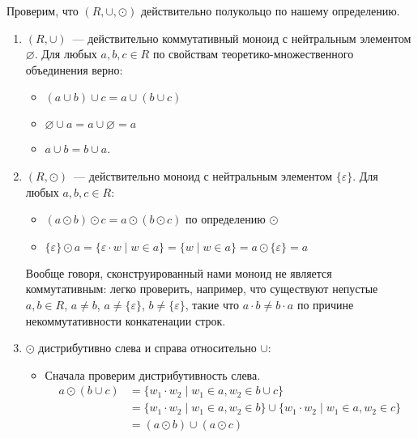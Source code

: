 \begin{example}
    Проверим, что $(R, \cup, \odot)$ действительно полукольцо по нашему определению.
    \begin{enumerate}
        \item $(R, \cup)$~--- действительно коммутативный моноид с нейтральным элементом $\varnothing$.
              Для любых $a, b, c \in R$ по свойствам теоретико-множественного объединения верно:
              \begin{itemize}
                  \item $(a \cup b) \cup c = a \cup (b \cup c)$
                  \item $\varnothing \cup a = a \cup \varnothing = a$
                  \item $a \cup b = b \cup a$.
              \end{itemize}
        \item $(R, \odot)$~--- действительно моноид с нейтральным элементом $\{\varepsilon\}$.
              Для любых $a, b, c \in R$:
              \begin{itemize}
                  \item $(a \odot b) \odot c = a \odot (b \odot c)$ по определению $\odot$
                  \item $\{\varepsilon\} \odot a = \{\varepsilon \cdot w \mid w \in a \} = \{w \mid w \in a \} = a \odot \{\varepsilon\} = a$
              \end{itemize}
              Вообще говоря, сконструированный нами моноид не является коммутативным: легко проверить, например, что существуют непустые $a, b \in R$, $a \neq b$, $a \neq \{\varepsilon\}$, $b \neq \{\varepsilon\}$, такие что $a \cdot b \neq b \cdot a$ по причине некоммутативности конкатенации строк.
        \item $\odot$ дистрибутивно слева и справа относительно $\cup$:
              \begin{itemize}
                  \item Сначала проверим дистрибутивность слева.
                        \begin{align*}
                            a \odot (b \cup c) & = \{ w_1 \cdot w_2 \mid  w_1 \in a, w_2 \in b \cup c\}                                                \\
                                               & = \{ w_1 \cdot w_2 \mid  w_1 \in a, w_2 \in b \} \cup  \{ w_1 \cdot w_2 \mid  w_1 \in a, w_2 \in c \} \\
                                               & =  (a \odot b) \cup (a \odot c)
                        \end{align*}

\end{itemize}
\end{enumerate}
\end{example}
